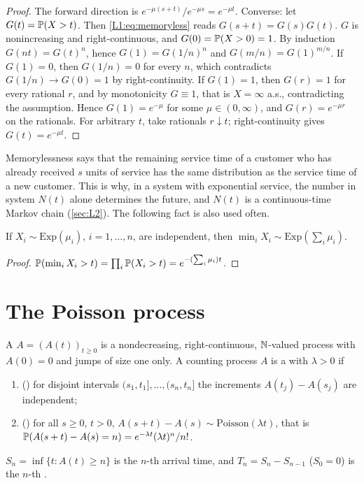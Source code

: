 \begin{proof}
The forward direction is $e^{-\mu(s+t)}/e^{-\mu s}=e^{-\mu t}$.
Converse: let $G(t)=\mathbb{P}(X>t)$. Then \eqref{L1:eq:memoryless} reads
$G(s+t)=G(s)G(t)$. $G$ is nonincreasing and right-continuous, and
$G(0)=\mathbb{P}(X>0)=1$. By induction $G(nt)=G(t)^n$, hence $G(1)=G(1/n)^n$ and
$G(m/n)=G(1)^{m/n}$.
If $G(1)=0$, then $G(1/n)=0$ for every $n$, which contradicts
$G(1/n)\to G(0)=1$ by right-continuity. If $G(1)=1$, then $G(r)=1$ for every
rational $r$, and by monotonicity $G\equiv1$, that is $X=\infty$ a.s., contradicting
the assumption. Hence $G(1)=e^{-\mu}$ for some $\mu\in(0,\infty)$, and
$G(r)=e^{-\mu r}$ on the rationals. For arbitrary $t$, take rationals $r\downarrow t$;
right-continuity gives $G(t)=e^{-\mu t}$.
\end{proof}

Memorylessness says that the remaining service time of a customer who has already
received $s$ units of service has the same distribution as the service time of a new
customer. This is why, in a system with exponential service, the number in system
$N(t)$ alone determines the future, and $N(t)$ is a continuous-time Markov chain
(\cref{sec:L2}). The following fact is also used often.

\begin{lemma}\label{L1:lem:min}
If $X_i\sim\mathrm{Exp}(\mu_i)$, $i=1,\dots,n$, are independent, then
$\min_iX_i\sim\mathrm{Exp}(\sum_i\mu_i)$.
\end{lemma}

\begin{proof}
$\mathbb{P}(\min_iX_i>t)=\prod_i\mathbb{P}(X_i>t)=e^{-(\sum_i\mu_i)t}$.
\end{proof}

\section{The Poisson process}

\begin{definition}\label{def:poisson}
A  $A=(A(t))_{t\ge0}$ is a nondecreasing, right-continuous,
$\mathbb{N}$-valued process with $A(0)=0$ and jumps of size one only.
A counting process $A$ is a  with  $\lambda>0$ if
\begin{enumerate}
\item () for disjoint intervals
  $(s_1,t_1],\dots,(s_n,t_n]$ the increments $A(t_j)-A(s_j)$ are independent;
\item () for all $s\ge0$, $t>0$,
  $A(s+t)-A(s)\sim\mathrm{Poisson}(\lambda t)$, that is
  $\mathbb{P}(A(s+t)-A(s)=n)=e^{-\lambda t}(\lambda t)^n/n!$.
\end{enumerate}
$S_n=\inf\{t:A(t)\ge n\}$ is the $n$-th arrival time, and $T_n=S_n-S_{n-1}$
($S_0=0$) is the $n$-th .
\end{definition}

